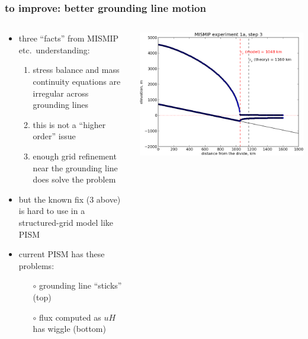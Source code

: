 \documentclass[hide notes,intlimits]{beamer}
\begin{document}
\begin{frame}
  \frametitle{to improve: better grounding line motion}
\begin{columns}
\begin{column}{0.6\textwidth}
  \begin{itemize}
  \item three ``facts'' from MISMIP etc.~understanding:
    \begin{enumerate}
    \item stress balance and mass continuity equations are irregular across grounding lines
    \item this is not a ``higher order'' issue
    \item enough grid refinement near the grounding line does solve the problem
    \end{enumerate}
  \item but the known fix (\alert{3} above) is hard to use in a structured-grid model like PISM
  \item current PISM has these problems:
    \begin{itemize}
    \item[$\circ$] grounding line ``sticks'' (top)
    \item[$\circ$] flux computed as $u H$ has wiggle (bottom)
    \end{itemize}
  \end{itemize}
\end{column}

\begin{column}{0.4\textwidth}
  \begin{center}
    \includegraphics[width=1.0\textwidth]{A3}


\end{center}
\end{column}
\end{columns}
\end{frame}
\end{document}
